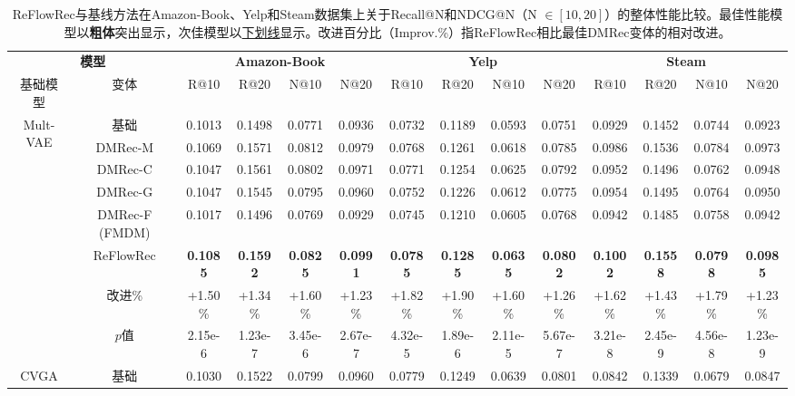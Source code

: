 \documentclass[sigconf]{acmart}
\begin{document}
\begin{table}
\small
        \centering
\setlength{\abovecaptionskip}{0.1cm}
\setlength{\belowcaptionskip}{0.1cm} 
  \caption{\textsf{ReFlowRec}与基线方法在Amazon-Book、Yelp和Steam数据集上关于Recall@N和NDCG@N（N $\in [10, 20]$）的整体性能比较。最佳性能模型以\textbf{粗体}突出显示，次佳模型以\underline{下划线}显示。改进百分比（Improv.\%）指\textsf{ReFlowRec}相比最佳DMRec变体的相对改进。}
  \label{performance1}
  \begin{tabular}{c|c|cccc|cccc|cccc}
    \hline
    \multicolumn{2}{c|}{\textbf{模型}}&\multicolumn{4}{c|}{\textbf{Amazon-Book}}&
    \multicolumn{4}{c|}{\textbf{Yelp}}&
    \multicolumn{4}{c}{\textbf{Steam}}\\
	\cline{1-14}		基础模型&变体&R@10&R@20&N@10&N@20&R@10&R@20&N@10&N@20&R@10&R@20&N@10&N@20\\
    \hline
    \hline
    \multirow{5}{*}{Mult-VAE} &基础\cite{liang2018variational} & 0.1013 & 0.1498 & 0.0771 & 0.0936 & 0.0732 & 0.1189 & 0.0593 & 0.0751 & 0.0929 &0.1452 & 0.0744 & 0.0923\\
    \cline{2-14}
    ~ &\textsf{DMRec-M}\cite{zhang2024dmrec} & 0.1069 & 0.1571 & 0.0812 & 0.0979 & 0.0768 & 0.1261 & 0.0618 & 0.0785 & 0.0986 & 0.1536 & 0.0784 & 0.0973\\
    ~ & \textsf{DMRec-C} & 0.1047 & 0.1561 & 0.0802 & 0.0971 & 0.0771 & 0.1254 & 0.0625 & 0.0792 & 0.0952 & 0.1496 & 0.0762 & 0.0948\\
    ~ & \textsf{DMRec-G} & 0.1047 & 0.1545 & 0.0795 & 0.0960 & 0.0752 & 0.1226 & 0.0612 & 0.0775 & 0.0954 & 0.1495 & 0.0764 & 0.0950\\
    ~ & \textsf{DMRec-F} (FMDM) & 0.1017 & 0.1496 & 0.0769 & 0.0929 & 0.0745 & 0.1210 & 0.0605 & 0.0768 & 0.0942 & 0.1485 & 0.0758 & 0.0942\\
    \cline{2-14}
    ~ & \textsf{ReFlowRec} & \textbf{0.1085} & \textbf{0.1592} & \textbf{0.0825} & \textbf{0.0991} & \textbf{0.0785} & \textbf{0.1285} & \textbf{0.0635} & \textbf{0.0802} & \textbf{0.1002} & \textbf{0.1558} & \textbf{0.0798} & \textbf{0.0985}\\
    \cline{2-14}
     ~ & 改进\% & +1.50\% & +1.34\% & +1.60\% & +1.23\% & +1.82\% & +1.90\% & +1.60\% & +1.26\% & +1.62\% & +1.43\% & +1.79\% & +1.23\%\\
     ~ & $p$值 & 2.15e-6 & 1.23e-7 & 3.45e-6 & 2.67e-7 & 4.32e-5 & 1.89e-6 & 2.11e-5 & 5.67e-7 & 3.21e-8 & 2.45e-9 & 4.56e-8 & 1.23e-9\\
      \hline
        \multirow{5}{*}{CVGA} &基础\cite{zhang2023revisiting} & 0.1030 & 0.1522 & 0.0799 & 0.0960 & 0.0779 & 0.1249 & 0.0639 & 0.0801 &0.0842 &0.1339 & 0.0679 & 0.0847\\

\end{tabular}
\end{table}
\end{document}
